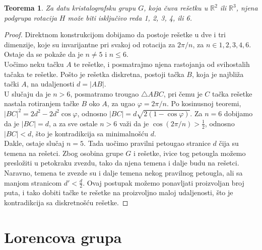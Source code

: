 \documentclass[times, utf8, diplomski]{fer}
\theoremstyle{plain}
\newtheorem{thm}{Teorema}
\theoremstyle{definition}
\begin{document}
\begin{thm}
Za datu kristalografsku grupu $G$, koja \v cuva re\v setku u $\mathbb{R}^2$ ili $\mathbb{R}^3$, njena podgrupa rotacija $H$ mo\v ze biti isklju\v civo reda 1, 2, 3, 4, ili 6.
\end{thm}
\begin{proof}
Direktnom konstrukcijom dobijamo da postoje re\v setke u dve i tri dimenzije, koje su invarijantne pri svakoj od rotacija za $2\pi/n$, za $n\in{1, 2, 3, 4, 6}$. Ostaje da se poka\v ze da je $n\neq 5$ i $n\leq 6$.\\
Uo\v cimo neku ta\v cku $A$ te re\v setke, i posmatrajmo njena rastojanja od svihostalih ta\v caka te re\v setke. Po\v sto je re\v setka diskretna, postoji ta\v cka $B$, koja je najbli\v za  ta\v cki $A$, na udaljenosti $d = |AB|$.\\
U slu\v caju da je $n>6$, posmatramo trougao $\triangle ABC$, pri \v cemu je $C$ ta\v cka re\v setke nastala rotiranjem ta\v cke $B$ oko $A$, za ugao $\varphi = 2\pi/n$. Po kosinusnoj teoremi, $|BC|^2 = 2 d^2-2 d^2 \cos\varphi$, odnosno $|BC| = d\sqrt{2(1-\cos\varphi)}$. Za $n=6$ dobijamo da je $|BC| = d$, a za sve ostale $n>6$ va\v zi da je $\cos(2\pi/n)>\frac12$, odnosno $|BC|<d$, \v sto je kontradikcija sa minimalno\v s\'cu $d$.\\
Dakle, ostaje slu\v caj $n=5$. Tada uo\v cimo pravilni petougao stranice $d$ \v cija su temena na re\v setci. Zbog osobina grupe $G$ i re\v setke, ivice tog petougla mo\v zemo preslo\v ziti u petokraku zvezdu, tako da njena temena i dalje budu na re\v setci. Naravno, temena te zvezde su i dalje temena nekog pravilnog petougla, ali sa manjom stranicom $d'<\frac d 2$. Ovaj postupak mo\v zemo ponavljati proizvoljan broj puta, i tako dobiti ta\v cke te re\v setke na proizvoljno maloj udaljenosti, \v sto je kontradikcija sa diskretno\v s\'cu re\v setke.
\end{proof}
\section{Lorencova grupa}
\end{document}
